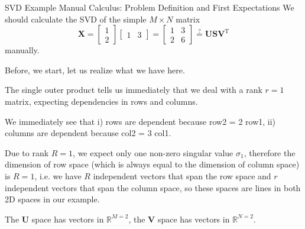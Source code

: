 \documentclass[mathserif, aspectratio=1610]{intbeamer}
\begin{document}
\begin{frame}[t]{SVD Example Manual Calculus: Problem Definition and First Expectations}
We should calculate the SVD of the simple $M \times N$ matrix
$$\bm{X} =
\begin{bmatrix}
1\\2
\end{bmatrix}
\begin{bmatrix}
1 & 3
\end{bmatrix}
=
\begin{bmatrix}
1 & 3\\
2 & 6
\end{bmatrix}
\stackrel{?}{=}
\bm{U}\bm{S}\bm{V}^\mathrm{T}
$$
manually.

Before, we start, let us realize what we have here.

The single outer product tells us immediately that we deal with a rank $r=1$ matrix, expecting dependencies
in rows and columns.

We immediately see that i) rows are dependent because row2 = 2 row1, ii) columns are dependent because col2 = 3 col1.

Due to rank $R=1$, we expect only one non-zero singular value $\sigma_1$, therefore the dimension
of row space (which is always equal to the dimension of column space) is $R=1$, i.e. we have $R$
independent vectors that span the row space and $r$ independent vectors that span the column space, so these spaces are lines in both 2D spaces in our example.

The $\bm{U}$ space has vectors in $\mathbb{R}^{M=2}$, the $\bm{V}$ space has vectors in $\mathbb{R}^{N=2}$.

\end{frame}
\end{document}
